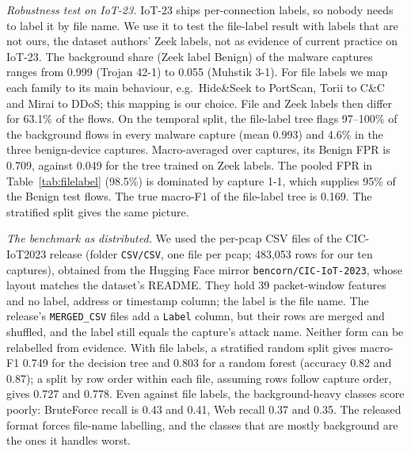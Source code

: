 \emph{Robustness test on IoT-23.} IoT-23 ships per-connection labels, so nobody needs to label it by file name. We use it to test the file-label result with labels that are not ours, the dataset authors' Zeek labels, not as evidence of current practice on IoT-23. The background share (Zeek label Benign) of the malware captures ranges from 0.999 (Trojan 42-1) to 0.055 (Muhstik 3-1). For file labels we map each family to its main behaviour, e.g.\ Hide\&Seek to PortScan, Torii to C\&C and Mirai to DDoS; this mapping is our choice. File and Zeek labels then differ for 63.1\% of the flows. On the temporal split, the file-label tree flags 97--100\% of the background flows in every malware capture (mean 0.993) and 4.6\% in the three benign-device captures. Macro-averaged over captures, its Benign FPR is 0.709, against 0.049 for the tree trained on Zeek labels. The pooled FPR in Table~\ref{tab:filelabel} (98.5\%) is dominated by capture 1-1, which supplies 95\% of the Benign test flows. The true macro-F1 of the file-label tree is 0.169. The stratified split gives the same picture.

\emph{The benchmark as distributed.} We used the per-pcap CSV files of the CIC-IoT2023 release (folder \texttt{CSV/CSV}, one file per pcap; 483,053 rows for our ten captures), obtained from the Hugging Face mirror \texttt{bencorn/CIC-IoT-2023}, whose layout matches the dataset's README. They hold 39 packet-window features and no label, address or timestamp column; the label is the file name. The release's \texttt{MERGED\_CSV} files add a \texttt{Label} column, but their rows are merged and shuffled, and the label still equals the capture's attack name. Neither form can be relabelled from evidence. With file labels, a stratified random split gives macro-F1 0.749 for the decision tree and 0.803 for a random forest (accuracy 0.82 and 0.87); a split by row order within each file, assuming rows follow capture order, gives 0.727 and 0.778. Even against file labels, the background-heavy classes score poorly: BruteForce recall is 0.43 and 0.41, Web recall 0.37 and 0.35. The released format forces file-name labelling, and the classes that are mostly background are the ones it handles worst.
